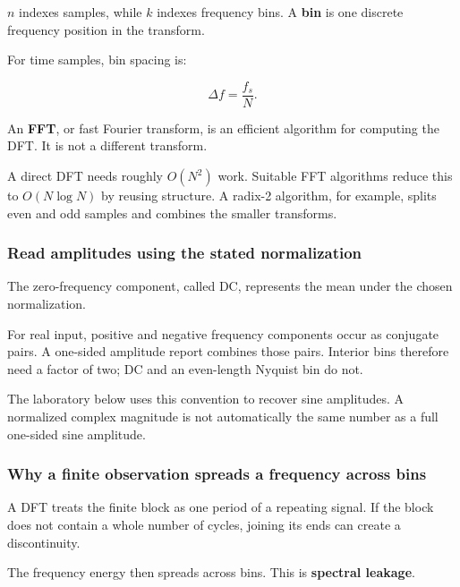 \(n\) indexes samples, while \(k\) indexes frequency bins. A \textbf{bin} is one discrete frequency position in the transform.

For time samples, bin spacing is:

\[
\Delta f=\frac{f_s}{N}.
\]

An \textbf{FFT}, or fast Fourier transform, is an efficient algorithm for computing the DFT. It is not a different transform.

A direct DFT needs roughly \(O(N^2)\) work. Suitable FFT algorithms reduce this to \(O(N\log N)\) by reusing structure. A radix-2 algorithm, for example, splits even and odd samples and combines the smaller transforms.

\subsubsection{Read amplitudes using the stated normalization}\label{04-visual-computing-ii-ch042-read-amplitudes-using-the-stated-normalization}

\hypertarget{04-visual-computing-ii-ch042-read-amplitudes-using-the-stated-normalization}{}

The zero-frequency component, called DC, represents the mean under the chosen normalization.

For real input, positive and negative frequency components occur as conjugate pairs. A one-sided amplitude report combines those pairs. Interior bins therefore need a factor of two; DC and an even-length Nyquist bin do not.

The laboratory below uses this convention to recover sine amplitudes. A normalized complex magnitude is not automatically the same number as a full one-sided sine amplitude.

\subsubsection{Why a finite observation spreads a frequency across bins}\label{04-visual-computing-ii-ch042-why-a-finite-observation-spreads-a-frequency-across-bins}

\hypertarget{04-visual-computing-ii-ch042-why-a-finite-observation-spreads-a-frequency-across-bins}{}

A DFT treats the finite block as one period of a repeating signal. If the block does not contain a whole number of cycles, joining its ends can create a discontinuity.

The frequency energy then spreads across bins. This is \textbf{spectral leakage}.

